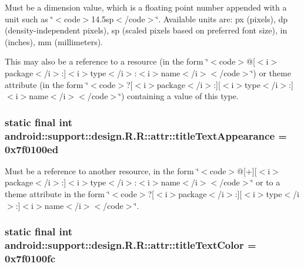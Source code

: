 Must be a dimension value, which is a floating point number appended with a unit such as \char`\"{}$<$code$>$14.5sp$<$/code$>$\char`\"{}. Available units are: px (pixels), dp (density-independent pixels), sp (scaled pixels based on preferred font size), in (inches), mm (millimeters). 

This may also be a reference to a resource (in the form \char`\"{}$<$code$>$@\mbox{[}$<$i$>$package$<$/i$>$:\mbox{]}$<$i$>$type$<$/i$>$:$<$i$>$name$<$/i$>$$<$/code$>$\char`\"{}) or theme attribute (in the form \char`\"{}$<$code$>$?\mbox{[}$<$i$>$package$<$/i$>$:\mbox{]}\mbox{[}$<$i$>$type$<$/i$>$:\mbox{]}$<$i$>$name$<$/i$>$$<$/code$>$\char`\"{}) containing a value of this type. \hypertarget{classandroid_1_1support_1_1design_1_1_r_1_1attr_c800d0e4aba2804f2bc3b0161c356e66}{
\subsubsection[{titleTextAppearance}]{\setlength{\rightskip}{0pt plus 5cm}static final int android::support::design.R.R::attr::titleTextAppearance = 0x7f0100ed}}
\label{classandroid_1_1support_1_1design_1_1_r_1_1attr_c800d0e4aba2804f2bc3b0161c356e66}


Must be a reference to another resource, in the form \char`\"{}$<$code$>$@\mbox{[}+\mbox{]}\mbox{[}$<$i$>$package$<$/i$>$:\mbox{]}$<$i$>$type$<$/i$>$:$<$i$>$name$<$/i$>$$<$/code$>$\char`\"{} or to a theme attribute in the form \char`\"{}$<$code$>$?\mbox{[}$<$i$>$package$<$/i$>$:\mbox{]}\mbox{[}$<$i$>$type$<$/i$>$:\mbox{]}$<$i$>$name$<$/i$>$$<$/code$>$\char`\"{}. \hypertarget{classandroid_1_1support_1_1design_1_1_r_1_1attr_cc5fc11896f81e92199d5038bdba9dca}{
\subsubsection[{titleTextColor}]{\setlength{\rightskip}{0pt plus 5cm}static final int android::support::design.R.R::attr::titleTextColor = 0x7f0100fc}}
\label{classandroid_1_1support_1_1design_1_1_r_1_1attr_cc5fc11896f81e92199d5038bdba9dca}


